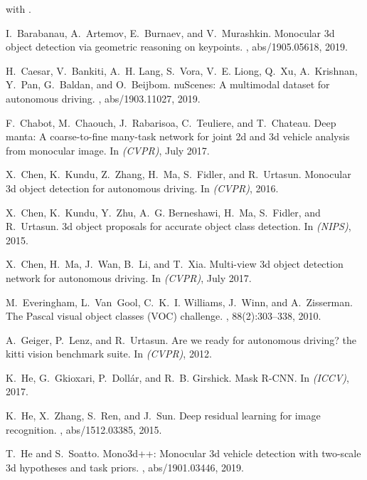 \documentclass[10pt,twocolumn,letterpaper]{article}
\begin{document}
with .

{
\small
\begin{thebibliography}{10}\itemsep=-1pt

I.~Barabanau, A.~Artemov, E.~Burnaev, and V.~Murashkin.
\newblock Monocular 3d object detection via geometric reasoning on keypoints.
, abs/1905.05618, 2019.

H.~Caesar, V.~Bankiti, A.~H. Lang, S.~Vora, V.~E. Liong, Q.~Xu, A.~Krishnan,
  Y.~Pan, G.~Baldan, and O.~Beijbom.
\newblock nu{S}cenes: {A} multimodal dataset for autonomous driving.
, abs/1903.11027, 2019.

F.~Chabot, M.~Chaouch, J.~Rabarisoa, C.~Teuliere, and T.~Chateau.
\newblock Deep manta: A coarse-to-fine many-task network for joint 2d and 3d
  vehicle analysis from monocular image.
\newblock In {\em (CVPR)}, July 2017.

X.~Chen, K.~Kundu, Z.~Zhang, H.~Ma, S.~Fidler, and R.~Urtasun.
\newblock Monocular 3d object detection for autonomous driving.
\newblock In {\em (CVPR)}, 2016.

X.~Chen, K.~Kundu, Y.~Zhu, A.~G. Berneshawi, H.~Ma, S.~Fidler, and R.~Urtasun.
\newblock 3d object proposals for accurate object class detection.
\newblock In {\em (NIPS)}, 2015.

X.~Chen, H.~Ma, J.~Wan, B.~Li, and T.~Xia.
\newblock Multi-view 3d object detection network for autonomous driving.
\newblock In {\em (CVPR)}, July 2017.

M.~Everingham, L.~Van~Gool, C.~K.~I. Williams, J.~Winn, and A.~Zisserman.
\newblock The {P}ascal visual object classes {(VOC)} challenge.
, 88(2):303--338, 2010.

A.~Geiger, P.~Lenz, and R.~Urtasun.
\newblock Are we ready for autonomous driving? the kitti vision benchmark
  suite.
\newblock In {\em (CVPR)}, 2012.

K.~He, G.~Gkioxari, P.~Doll{\'{a}}r, and R.~B. Girshick.
\newblock Mask {R-CNN}.
\newblock In {\em (ICCV)}, 2017.

K.~He, X.~Zhang, S.~Ren, and J.~Sun.
\newblock Deep residual learning for image recognition.
, abs/1512.03385, 2015.

T.~He and S.~Soatto.
\newblock Mono3d++: Monocular 3d vehicle detection with two-scale 3d hypotheses
  and task priors.
, abs/1901.03446, 2019.


\end{thebibliography}}
\end{document}
